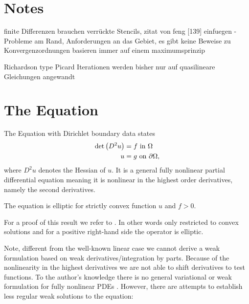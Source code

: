 \section{Notes}
finite Differenzen brauchen verrückte Stencils, zitat von feng [139] einfuegen - Probleme am Rand, Anforderungen an das Gebiet, es gibt keine Beweise zu Konvergenzordnungen
basieren immer auf einem maximumsprinzip

Richardson type Picard Iterationen werden bisher nur auf quasilineare Gleichungen angewandt

\section{The \MA Equation}

The \MA Equation with Dirichlet boundary data states
\begin{align}
	 \det{\left(D^2 u\right)} &= f \textnormal{ in } \Omega \label{MA eq}\\
	 u & = g \textnormal{ on } \partial \Omega,
\end{align}
where $D^2 u$ denotes the Hessian of $u$.
It is a general fully nonlinear partial differential equation meaning it is nonlinear in the highest order derivatives, namely the second derivatives.

\begin{proposition}
	The \MA equation is elliptic for strictly convex function $u$ and $f > 0$.
\end{proposition}
For a proof of this result we refer to \cite{CC1995, GT1977}. In other words only restricted to convex solutions and for a positive right-hand side the \MA operator is elliptic.

Note, different from the well-known linear case we cannot derive a weak formulation based on weak derivatives/integration by parts. Because of the nonlinearity in the highest derivatives we are not able to shift derivatives to test functions. To the author's knowledge there is no general variational or weak formulation for fully nonlinear PDEs \cite{FGN2013}.
However, there are attempts to establish less regular weak solutions to the \MA equation:

